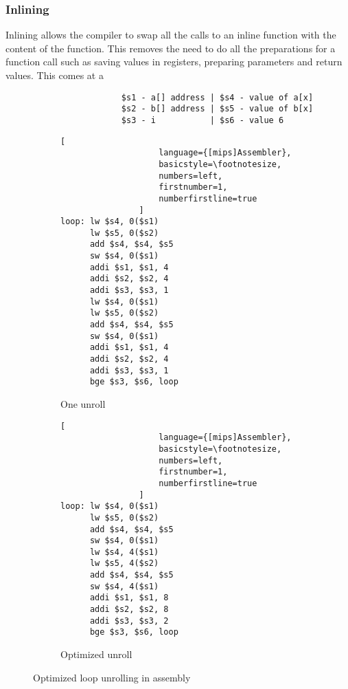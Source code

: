 \subsubsection{Inlining}
Inlining allows the compiler to swap all the calls to an inline function with the content of the function. This removes the need to do all the preparations for a function call such as saving values in registers, preparing parameters and return values. This comes at a 

\begin{figure}[h]
    \centering
    \begin{adjustbox}{minipage=\linewidth,scale=0.8}
        \centering
        \begin{verbatim}
                  $s1 - a[] address | $s4 - value of a[x]
                  $s2 - b[] address | $s5 - value of b[x]
                  $s3 - i           | $s6 - value 6
        \end{verbatim}
        \begin{subfigure}{.55\textwidth}
            \centering
            \begin{lstlisting}[
                    language={[mips]Assembler},
                    basicstyle=\footnotesize,
                    numbers=left,
                    firstnumber=1,
                    numberfirstline=true
                ]
loop: lw $s4, 0($s1)
      lw $s5, 0($s2)
      add $s4, $s4, $s5
      sw $s4, 0($s1)
      addi $s1, $s1, 4
      addi $s2, $s2, 4
      addi $s3, $s3, 1
      lw $s4, 0($s1)
      lw $s5, 0($s2)
      add $s4, $s4, $s5
      sw $s4, 0($s1)
      addi $s1, $s1, 4
      addi $s2, $s2, 4
      addi $s3, $s3, 1
      bge $s3, $s6, loop
                \end{lstlisting}
            \caption{One unroll}
            \label{fig:optimized:sub1}
        \end{subfigure}%
        \begin{subfigure}{.3\textwidth}
            \centering
            \begin{lstlisting}[
                    language={[mips]Assembler},
                    basicstyle=\footnotesize,
                    numbers=left,
                    firstnumber=1,
                    numberfirstline=true
                ]
loop: lw $s4, 0($s1)
      lw $s5, 0($s2)
      add $s4, $s4, $s5
      sw $s4, 0($s1)
      lw $s4, 4($s1)
      lw $s5, 4($s2)
      add $s4, $s4, $s5
      sw $s4, 4($s1)
      addi $s1, $s1, 8
      addi $s2, $s2, 8
      addi $s3, $s3, 2
      bge $s3, $s6, loop
                \end{lstlisting}
            \caption{Optimized unroll}
            \label{fig:optimized:sub2}
        \end{subfigure}
    \end{adjustbox}
    \caption{Optimized loop unrolling in assembly}
    \label{fig:assembly:optimized}
\end{figure}

